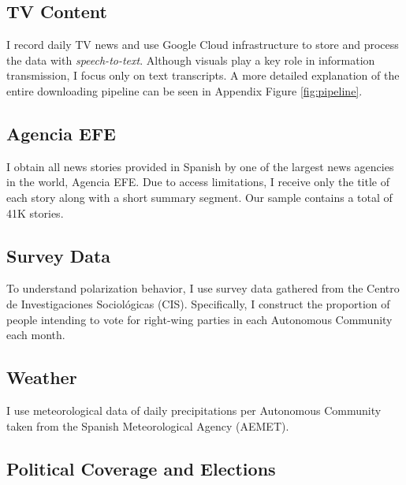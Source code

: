 \documentclass[12pt]{article}
\begin{document}
	
	
	\subsection*{TV Content}
	
	I record daily TV news and use Google Cloud infrastructure to store and process the data with \textit{speech-to-text}. Although visuals play a key role in information transmission, I focus only on text transcripts. A more detailed explanation of the entire downloading pipeline can be seen in Appendix Figure \ref{fig:pipeline}.
	
	
	\subsection*{Agencia EFE}
	
	I obtain all news stories provided in Spanish by one of the largest news agencies in the world, Agencia EFE. Due to access limitations, I receive only the title of each story along with a short summary segment. Our sample contains a total of 41K stories.
	
	\subsection*{Survey Data}
	
	To understand polarization behavior, I use survey data gathered from the Centro de Investigaciones Sociológicas (CIS). Specifically, I construct the proportion of people intending to vote for right-wing parties in each Autonomous Community each month.
	
	\subsection*{Weather}
	
	I use meteorological data of daily precipitations per Autonomous Community taken from the Spanish Meteorological Agency (AEMET).
	
	
	\subsection{Political Coverage and Elections}
	
\end{document}
